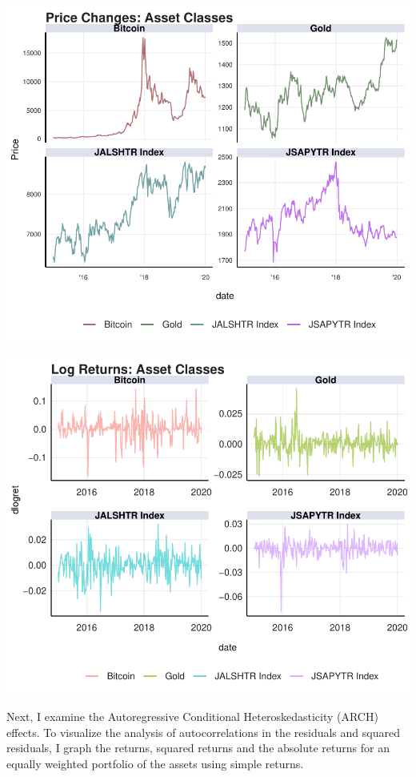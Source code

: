 \documentclass[11pt,preprint, authoryear]{elsarticle}
\numberwithin{equation}{section}
\numberwithin{figure}{section}
\numberwithin{table}{section}
\begin{document}
\includegraphics{FinMetrics-Essay_files/figure-latex/unnamed-chunk-1-1.pdf}

\includegraphics{FinMetrics-Essay_files/figure-latex/unnamed-chunk-2-1.pdf}

Next, I examine the Autoregressive Conditional Heteroskedasticity (ARCH)
effects. To visualize the analysis of autocorrelations in the residuals
and squared residuals, I graph the returns, squared returns and the
absolute returns for an equally weighted portfolio of the assets using
simple returns.
\end{document}
